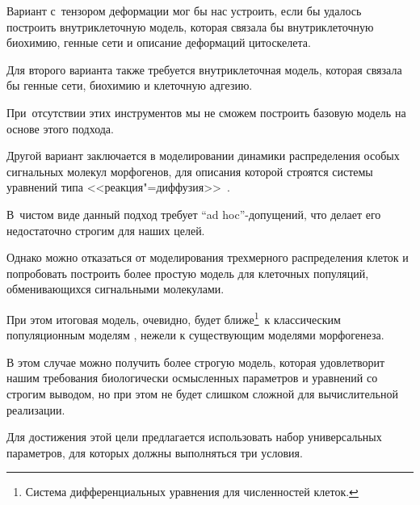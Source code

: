Вариант с~тензором деформации мог бы нас устроить, если бы удалось построить  внутриклеточную модель, которая  связала бы внутриклеточную биохимию, генные сети и описание деформаций цитоскелета. 

Для второго варианта также требуется внутриклеточная модель, которая связала бы  генные сети, биохимию и клеточную адгезию.


При~отсутствии этих инструментов мы не сможем построить базовую модель на основе этого подхода.  

Другой вариант заключается в моделировании динамики распределения особых сигнальных молекул морфогенов, для описания которой строятся системы уравнений типа <<реакция"=диффузия>>~\cite{Keller:bib:Keller1970}. 

В~чистом виде данный подход требует ``ad hoc''-допущений, что делает его недостаточно строгим для наших целей. %



Однако можно отказаться от моделирования трехмерного распределения клеток и попробовать построить более простую модель для клеточных популяций, обменивающихся сигнальными молекулами. 

При этом итоговая модель, очевидно, будет ближе\footnote{Система дифференциальных уравнения для численностей клеток.}\!\!~к классическим популяционным моделям \cite{Brauer:bib:Brauer2012}, нежели к существующим моделями морфогенеза.

В этом случае можно получить более строгую модель, которая удовлетворит нашим требования биологически осмысленных параметров и уравнений со строгим выводом, но при этом не будет слишком сложной для вычислительной реализации.





 

Для достижения этой цели предлагается использовать набор универсальных параметров, для которых  должны выполняться три условия.  

